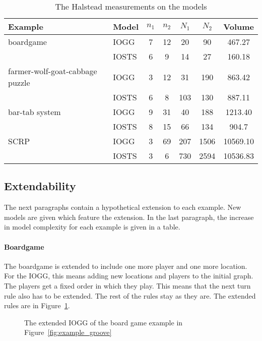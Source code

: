 \begin{table}[ht]
\begin{center}
\begin{tabular}{| l | l | c | c | c | c | c |}
  \hline
  \textbf{Example} & \textbf{Model} & $n_1$ & $n_2$ & $N_1$ & $N_2$ & Volume \\ \hline
  boardgame & IOGG & 7 & 12 & 20 & 90 & 467.27 \\
  & IOSTS & 6 & 9 & 14 & 27 & 160.18 \\ \hline
  farmer-wolf-goat-cabbage puzzle & IOGG & 3 & 12 & 31 & 190 & 863.42 \\ 
  & IOSTS & 6 & 8 & 103 & 130 & 887.11 \\ \hline
  bar-tab system & IOGG & 9 & 31 & 40 & 188 & 1213.40 \\
  & IOSTS & 8 & 15 & 66 & 134 & 904.7 \\ \hline
  SCRP & IOGG & 3 & 69 & 207 & 1506 & 10569.10 \\ 
  & IOSTS & 3 & 6 & 730 & 2594 & 10536.83 \\
  \hline
\end{tabular}
\end{center}
\caption{The Halstead measurements on the models}
\label{tab:halstead}
\end{table}

\subsection{Extendability}
The next paragraphs contain a hypothetical extension to each example. New models are given which feature the extension. In the last paragraph, the increase in model complexity for each example is given in a table.

\paragraph*{Boardgame}
The boardgame is extended to include one more player and one more location. For the IOGG, this means adding new locations and players to the initial graph. The players get a fixed order in which they play. This means that the next turn rule also has to be extended. The rest of the rules stay as they are. The extended rules are in Figure~\ref{fig:gg-bg-extended}.

\begin{figure}[ht]
  \begin{center}
    \hspace{20px}
  \end{center}
  \caption{The extended IOGG of the board game example in Figure~\ref{fig:example_groove}}
  \label{fig:gg-bg-extended}
\end{figure}

